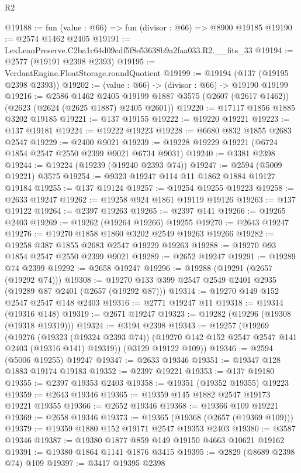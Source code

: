 \begin{lexlean}{R2}
\begin{coremodule}
@19188 := fun (value : @66) => fun (divisor : @66) => @8900 @19185
@19190 := @2574 @1462 @2405
@19191 := LexLeanPreserve.C2ba1c64d09cdf5f8e53638b9a2faa033.R2.__fits_33
@19194 := @2577 (@19191 @2398 @2393)
@19195 := VerdantEngine.FloatStorage.roundQuotient
@19199 := @19194 (@137 (@19195 @2398 @2393))
@19202 := (value : @66) -> (divisor : @66) -> @19190 @19199
@19216 := @2586
    @1462
    @2405
    @19199
    @1887
    @3575
    (@2607 (@2617 @1462))
    (@2623 (@2624 (@2625 @1887) @2405 @2601))
@19220 := @17117 @1856 @1885 @3202 @19185
@19221 := @137 @19155
@19222 := @19220 @19221
@19223 := @137 @19181
@19224 := @19222 @19223
@19228 := @6680 @832 @1855 @2683 @2547
@19229 := @2400 @9021
@19239 := @19228 @19229 @19221 (@6724 @1854 @2547 @2550 @2399 @9021 @6734 @9031)
@19240 := @3381 @2398
@19244 := @19224 (@19239 (@19240 @2393 @74))
@19247 := @2594 (@5009 @19221) @3575
@19254 := @9323 @19247 @114 @11 @1862 @1884 @19127 @19184
@19255 := @137 @19124
@19257 := @19254 @19255 @19223
@19258 := @2633 @19247
@19262 := @19258 @924 @1861 @19119 @19126
@19263 := @137 @19122
@19264 := @2397 @19263
@19265 := @2397 @141
@19266 := @19265 @2403
@19269 := @19262 (@19264 @19266) @19255
@19270 := @2643 @19247
@19276 := @19270 @1858 @1860 @3202 @2549 @19263 @19266
@19282 := @19258 @387 @1855 @2683 @2547 @19229 @19263
@19288 := @19270 @93 @1854 @2547 @2550 @2399 @9021
@19289 := @2652 @19247
@19291 := @19289 @74 @2399
@19292 := @2658 @19247
@19296 := @19288 (@19291 (@2657 (@19292 @74)))
@19308 := @19270 @133 @399 @2547 @2549 @2401 @2935 (@19289 @87 @2401 (@2657 (@19292 @87)))
@19314 := @19270 @149 @152 @2547 @2547 @148 @2403
@19316 := @2771 @19247 @11
@19318 := @19314 (@19316 @148)
@19319 := @2671 @19247
@19323 := @19282 (@19296 (@19308 (@19318 @19319)))
@19324 := @3194 @2398
@19343 := @19257
    (@19269
      (@19276
        (@19323 (@19324 @2393 @74))
        (@19270 @142 @152 @2547 @2547 @141 @2403 (@19316 @141) @19319))
      (@3129 @19122 @109))
@19346 := @2594 (@5006 @19255) @19247
@19347 := @2633 @19346
@19351 := @19347 @128 @1883 @19174 @19183
@19352 := @2397 @19221
@19353 := @137 @19180
@19355 := @2397 @19353 @2403
@19358 := @19351 (@19352 @19355) @19223
@19359 := @2643 @19346
@19365 := @19359 @145 @1882 @2547 @19173 @19221 @19355
@19366 := @2652 @19346
@19368 := @19366 @109 @19221
@19369 := @2658 @19346
@19373 := @19365 (@19368 (@2657 (@19369 @109)))
@19379 := @19359 @1880 @152 @19171 @2547 @19353 @2403
@19380 := @3587 @19346
@19387 := @19380 @1877 @859 @149 @19150 @4663 @10621 @19162
@19391 := @19380 @1864 @1141 @1876 @3415
@19395 := @2829 (@8689 @2398 @74) @109
@19397 := @3417 @19395 @2398

\end{coremodule}
\end{lexlean}
